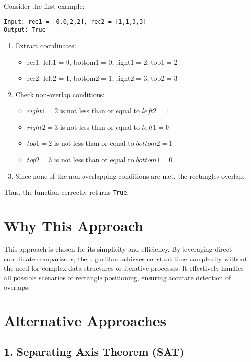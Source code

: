 Consider the first example:
\begin{verbatim}
Input: rec1 = [0,0,2,2], rec2 = [1,1,3,3]
Output: True
\end{verbatim}

\begin{enumerate}
    \item Extract coordinates:
    \begin{itemize}
        \item rec1: left1 = 0, bottom1 = 0, right1 = 2, top1 = 2
        \item rec2: left2 = 1, bottom2 = 1, right2 = 3, top2 = 3
    \end{itemize}
    
    \item Check non-overlap conditions:
    \begin{itemize}
        \item \(right1 = 2\) is not less than or equal to \(left2 = 1\)
        \item \(right2 = 3\) is not less than or equal to \(left1 = 0\)
        \item \(top1 = 2\) is not less than or equal to \(bottom2 = 1\)
        \item \(top2 = 3\) is not less than or equal to \(bottom1 = 0\)
    \end{itemize}
    
    \item Since none of the non-overlapping conditions are met, the rectangles overlap.
\end{enumerate}

Thus, the function correctly returns \texttt{True}.

\section*{Why This Approach}

This approach is chosen for its simplicity and efficiency. By leveraging direct coordinate comparisons, the algorithm achieves constant time complexity without the need for complex data structures or iterative processes. It effectively handles all possible scenarios of rectangle positioning, ensuring accurate detection of overlaps.

\section*{Alternative Approaches}

\subsection*{1. Separating Axis Theorem (SAT)}

